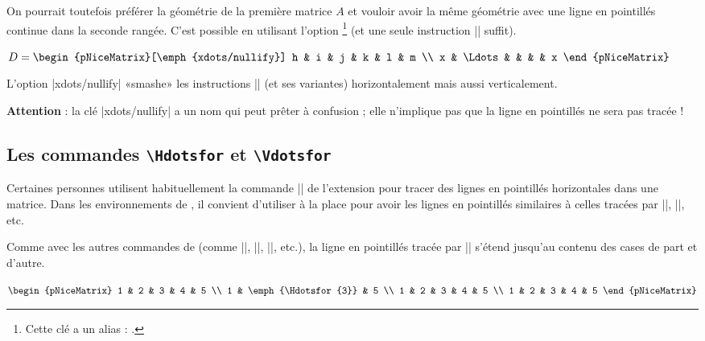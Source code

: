 \documentclass[dvipsnames]{article}
\begin{document}
\medskip
On pourrait toutefois préférer la géométrie de la première matrice $A$ et
vouloir avoir la même géométrie avec une ligne en pointillés continue dans la
seconde rangée. C'est possible en utilisant l'option \footnote{Cette clé a un alias : .}
(et une seule instruction |\Ldots| suffit).

\nobreak
\medskip
\begin{Code}[width=10cm,show-output]
$D = \begin{pNiceMatrix}[\emph{xdots/nullify}]
h & i & j & k & l & m \\
x & \Ldots & & & & x
\end{pNiceMatrix}$
\end{Code}

\medskip
L'option |xdots/nullify| «smashe» les instructions |\Ldots| (et ses variantes)
horizontalement mais aussi verticalement.

\medskip
\textbf{Attention} : la clé |xdots/nullify| a un nom qui peut prêter à confusion ; 
elle n'implique pas que la ligne en pointillés ne sera pas tracée ! 


\subsection{Les commandes \texttt{\textbackslash Hdotsfor} et \texttt{\textbackslash Vdotsfor}}


Certaines personnes utilisent habituellement la commande |\hdotsfor| de
l'extension  pour tracer des lignes en pointillés horizontales dans
une matrice. Dans les environnements de , il convient d'utiliser
 à la place pour avoir les lignes en pointillés
similaires à celles tracées par |\Cdots|, |\Vdots|, etc.

Comme avec les autres commandes de  (comme |\Cdots|, |\Ldots|,
|\Vdots|, etc.), la ligne en pointillés tracée par |\Hdotsfor| s'étend jusqu'au
contenu des cases de part et d'autre.

\medskip
\begin{Code}[width=7cm,show-output]
$\begin{pNiceMatrix}
1 & 2 & 3 & 4 & 5 \\
1 & \emph{\Hdotsfor{3}} & 5 \\
1 & 2 & 3 & 4 & 5 \\
1 & 2 & 3 & 4 & 5
\end{pNiceMatrix}$
\end{Code}
\end{document}
